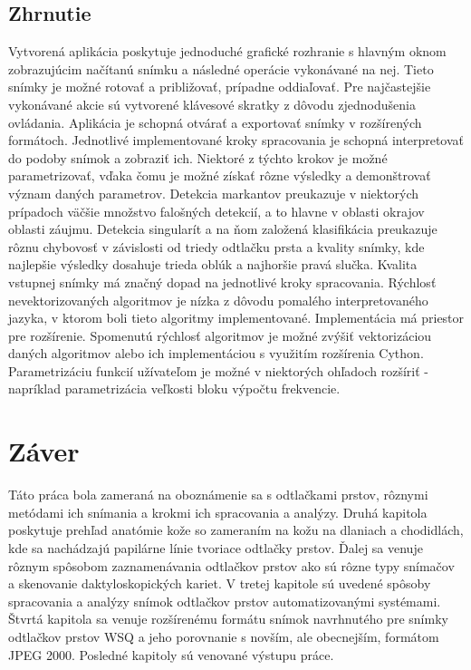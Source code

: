   \section{Zhrnutie}
  Vytvorená aplikácia poskytuje jednoduché grafické rozhranie s hlavným oknom zobrazujúcim načítanú snímku a následné operácie vykonávané na nej.
  Tieto snímky je možné rotovať a približovať, prípadne oddiaľovať. Pre najčastejšie vykonávané akcie sú vytvorené klávesové skratky z dôvodu zjednodušenia
  ovládania.
  Aplikácia je schopná otvárať a exportovať snímky v rozšírených formátoch. Jednotlivé implementované kroky spracovania je schopná interpretovať
  do podoby snímok a zobraziť ich. Niektoré z týchto krokov je možné parametrizovať, vďaka čomu je možné získať rôzne výsledky a demonštrovať význam daných
  parametrov. Detekcia markantov preukazuje v niektorých prípadoch väčšie množstvo falošných detekcií, a to hlavne v oblasti okrajov oblasti záujmu.
  Detekcia singularít a na ňom založená klasifikácia preukazuje rôznu chybovosť v závislosti od triedy odtlačku prsta a kvality snímky,
  kde najlepšie výsledky dosahuje trieda oblúk a najhoršie pravá slučka. Kvalita vstupnej snímky má značný dopad na jednotlivé kroky spracovania.
  Rýchlosť nevektorizovaných algoritmov je nízka z dôvodu pomalého interpretovaného jazyka, v ktorom boli tieto algoritmy implementované.
  Implementácia má priestor pre rozšírenie. Spomenutú rýchlosť algoritmov je možné zvýšiť vektorizáciou daných algoritmov alebo ich implementáciou
  s využitím rozšírenia Cython. Parametrizáciu funkcií užívateľom je možné v niektorých ohľadoch rozšíriť - napríklad parametrizácia veľkosti bloku výpočtu
  frekvencie.

  \chapter{Záver}
  Táto práca bola zameraná na oboznámenie sa s odtlačkami prstov, rôznymi metódami ich snímania a krokmi ich spracovania a analýzy. Druhá kapitola poskytuje
  prehľad anatómie kože so zameraním na kožu na dlaniach a chodidlách, kde sa nachádzajú papilárne línie tvoriace odtlačky prstov. Ďalej sa venuje rôznym
  spôsobom zaznamenávania odtlačkov prstov ako sú rôzne typy snímačov a skenovanie daktyloskopických kariet. V tretej kapitole sú uvedené spôsoby
  spracovania a analýzy snímok odtlačkov prstov automatizovanými systémami. Štvrtá kapitola sa venuje rozšírenému formátu snímok navrhnutého pre snímky
  odtlačkov prstov WSQ a jeho porovnanie s novším, ale obecnejším, formátom JPEG 2000. Posledné kapitoly sú venované výstupu práce.


